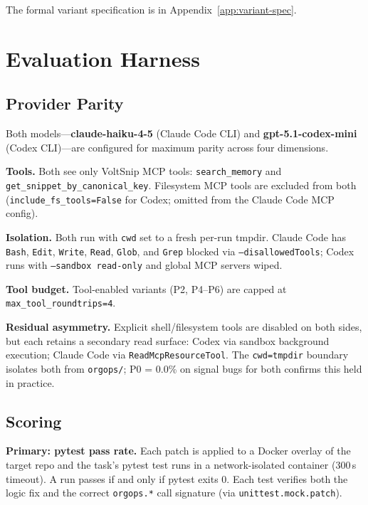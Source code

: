 \documentclass[10pt,a4paper,twocolumn]{article}
\begin{document}
The formal variant specification is in Appendix~\ref{app:variant-spec}.

\section{Evaluation Harness}
\label{sec:harness}

\subsection{Provider Parity}
\label{sec:provider-parity}

Both models---\textbf{claude-haiku-4-5} (Claude Code CLI) and \textbf{gpt-5.1-codex-mini} (Codex CLI)---are configured for maximum parity across four dimensions.

\textbf{Tools.} Both see only VoltSnip MCP tools: \texttt{search\_memory} and \texttt{get\_snippet\_by\_canonical\_key}. Filesystem MCP tools are excluded from both (\texttt{include\_fs\_tools=False} for Codex; omitted from the Claude Code MCP config).

\textbf{Isolation.} Both run with \texttt{cwd} set to a fresh per-run tmpdir. Claude Code has \texttt{Bash}, \texttt{Edit}, \texttt{Write}, \texttt{Read}, \texttt{Glob}, and \texttt{Grep} blocked via \texttt{--disallowedTools}; Codex runs with \texttt{--sandbox read-only} and global MCP servers wiped.

\textbf{Tool budget.} Tool-enabled variants (P2, P4--P6) are capped at \texttt{max\_tool\_roundtrips=4}.

\textbf{Residual asymmetry.} Explicit shell/filesystem tools are disabled on both sides, but each retains a secondary read surface: Codex via sandbox background execution; Claude Code via \texttt{ReadMcpResourceTool}. The \texttt{cwd=tmpdir} boundary isolates both from \texttt{orgops/}; P0 = 0.0\% on signal bugs for both confirms this held in practice.
\subsection{Scoring}
\label{sec:scoring}

\textbf{Primary: pytest pass rate.} Each patch is applied to a Docker overlay of the target repo and the task's pytest test runs in a network-isolated container (300\,s timeout). A run passes if and only if pytest exits 0. Each test verifies both the logic fix and the correct \texttt{orgops.*} call signature (via \texttt{unittest.mock.patch}).
\end{document}
